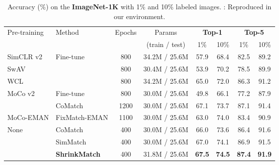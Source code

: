 \documentclass[10pt,twocolumn,letterpaper]{article}
\begin{document}
\begin{table*}[t]
\centering
\small
\setlength\tabcolsep{3.5mm}
    \centering
    \begin{tabular}{llcc|cccc}
    \toprule
    
    \multirow{2}{*}{Pre-training} & \multirow{2}{*}{Method} & \multirow{2}{*}{Epochs} & Params & \multicolumn{2}{c}{\textbf{Top-1}} & \multicolumn{2}{c}{\textbf{Top-5}} \\
    
    ~ & ~ & ~ & (train / test) & 1\% & 10\% & 1\% & 10\% \\
    
    \midrule
    
    SimCLR v2 \cite{simclrv2} & \multirow{3}{*}{Fine-tune} & 800 & 34.2M / 25.6M & 57.9 & 68.4 & 82.5 & 89.2 \\
    
    SwAV \cite{swav} & ~ & 800 & 30.4M / 25.6M & 53.9 & 70.2 & 78.5 & 89.9 \\
    
    WCL \cite{wcl} & ~ & 800 & 34.2M / 25.6M & 65.0 & 72.0 & 86.3 & 91.2 \\
    
    \cmidrule{2-8}
    
    \multirow{2}{*}{MoCo v2 \cite{mocov2}} & Fine-tune & 800 & 30.0M / 25.6M & 49.8 & 66.1 & 77.2 & 87.9 \\
    
    ~ & CoMatch \cite{comatch} & 1200 & 30.0M / 25.6M & 67.1 & 73.7 & 87.1 & 91.4 \\
    
    MoCo-EMAN \cite{eman} & FixMatch-EMAN \cite{eman} & 1100 & 30.0M / 25.6M & 63.0 & 74.0 & 83.4 & 90.9 \\
    
    \midrule
    
    \multirow{3}{*}{None} & CoMatch \cite{comatch} & 400 & 30.0M / 25.6M & 66.0 & 73.6 & 86.4 & 91.6 \\
    
    ~ & SimMatch \cite{simmatch} & 400 & 30.0M / 25.6M & 67.0 & 74.1 & 86.9 & 91.5 \\
    
    ~ & \textbf{ShrinkMatch} & 400 & 31.8M / 25.6M & \textbf{67.5} & \textbf{74.5} & \textbf{87.4} & \textbf{91.9} \\
    
    \bottomrule

    \end{tabular}
    \vspace{-1mm}
    \caption{Accuracy (\%) on the \textbf{ImageNet-1K} with 1\% and 10\% labeled images. : Reproduced in our environment.}
    \label{tab:imagenet}
\end{table*} 
\end{document}
